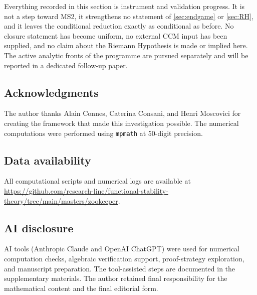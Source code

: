 \documentclass[12pt,a4paper]{article}
\theoremstyle{definition}
\theoremstyle{remark}
\begin{document}
Everything recorded in this section is instrument and validation
progress.  It is not a step toward MS2, it strengthens no statement of
\cref{sec:endgame} or \cref{sec:RH}, and it leaves the conditional
reduction exactly as conditional as before.  No closure statement has
become uniform, no external CCM input has been supplied, and no claim
about the Riemann Hypothesis is made or implied here.  The active
analytic fronts of the programme are pursued separately and will be
reported in a dedicated follow-up paper.

\bigskip

\subsection*{Acknowledgments}

The author thanks Alain Connes, Caterina Consani, and Henri Moscovici
for creating the framework that made this investigation possible.
The numerical computations were performed using \texttt{mpmath}
\cite{mpmath} at 50-digit precision.

\subsection*{Data availability}

All computational scripts and numerical logs are available at
\url{https://github.com/research-line/functional-stability-theory/tree/main/masters/zookeeper}.

\subsection*{AI disclosure}

AI tools (Anthropic Claude and OpenAI ChatGPT) were used for numerical
computation checks, algebraic verification support, proof-strategy
exploration, and manuscript preparation.  The tool-assisted steps are
documented in the supplementary materials.
The author retained final responsibility for the mathematical content and
the final editorial form.

\end{document}

